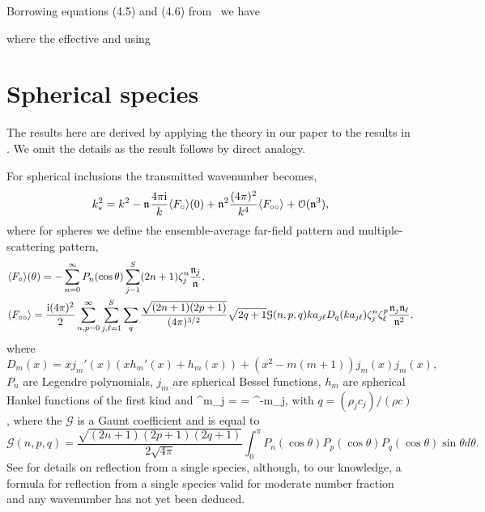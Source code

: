 \documentclass[12pt, a4paper]{article}
\begin{document}
Borrowing equations (4.5) and (4.6) from~\cite{gower_reflection_2017} we have


where the effective   and using 

\section{Spherical species}
\label{sec:Effective3D}

The results here are derived by applying the theory in our paper to the results in \cite{linton_multiple_2006}. We omit the details as the result follows by direct analogy.

For spherical inclusions the transmitted wavenumber becomes,
\begin{align}
   k_*^2 = k^2 -\mathfrak n_{} \frac{4 \pi \textrm{i}}{k}  \langle F_\circ \rangle(0) + \mathfrak n_{}^2 \frac{(4 \pi)^2 }{k^4} \langle F_{\circ\circ} \rangle
   + \mathcal O(\mathfrak n_{}^3),
  \label{eqn:SmallNfracSpheres}
\end{align}
where for spheres we define the ensemble-average far-field pattern and multiple-scattering pattern,
\begin{align}
  &\langle F_\circ \rangle(\theta) = - \sum_{n=0}^\infty P_n (\cos \theta ) \sum_{j=1}^S (2n+1)  \zeta^n_j \frac{\mathfrak n_{j}}{\mathfrak n_{}},
\\
  &\langle F_{\circ\circ} \rangle = \frac{\textrm{i} (4 \pi)^2}{2} \sum_{n,p=0}^\infty \sum_{j,\ell=1}^S \sum_q  \frac{\sqrt{(2n+1)(2p+1)}}{(4 \pi)^{3/2}}  \sqrt{2 q +1} \mathcal G(n,p,q) k a_{j\ell} D_q(k a_{j\ell}) \zeta^n_j \zeta^p_\ell \frac{\mathfrak n_{j} \mathfrak n_{\ell}}{\mathfrak n_{}^2},
\notag
\end{align}
where
\[
D_m(x) = x j_m'(x)( x h_m'(x) + h_m(x)) + (x^2 - m(m+1))j_m(x) j_m(x),
\]
$P_n$ are   Legendre polynomials, $j_m$ are   spherical Bessel functions, $h_m$ are spherical Hankel functions of the first kind  and
\be
\scatZs^m_j =  = \scatZs^{-m}_j,
\label{eqn:Zm}
\en
with $q = (\rho_j c_j)/(\rho c)$, where the $\mathcal G$ is a Gaunt coefficient and is equal to
\[
\mathcal G(n,p,q) = \frac{\sqrt{(2n+1)(2p+1)(2q+1)}}{2 \sqrt{4 \pi}}   \int_0^\pi  P_n(\cos \theta) P_p(\cos \theta) P_q(\cos \theta) \sin \theta d \theta.
\]
See \cite{caleap_effective_2012} for details on reflection from a single species, although, to our knowledge, a formula for reflection from a single species valid for moderate number fraction and any wavenumber has not yet been deduced.

\printbibliography

% 
% 
\end{document}

